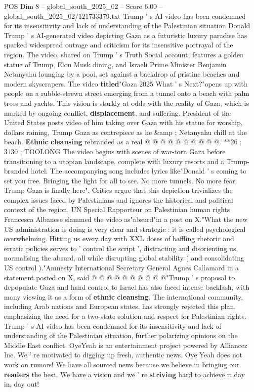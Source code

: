 \begin{textsample}{POS Dim 8 – global\_south\_2025\_02 – Score 6.00 – global\_south\_2025\_02/121733379.txt}  \label{ex:f8_pos_079}
Trump ' s AI video has been condemned for its insensitivity and lack of understanding of the Palestinian situation Donald Trump ' s AI-generated video depicting Gaza as a futuristic luxury paradise has sparked widespread outrage and criticism for its insensitive portrayal of the region.
The video, shared on Trump ' s Truth Social account, features a golden statue of Trump, Elon Musk dining, and Israeli Prime Minister Benjamin Netanyahu lounging by a pool, set against a backdrop of pristine beaches and modern skyscrapers.
The video \textbf{titled}"Gaza 2025 What ' s Next?"opens up with people on a rubble-strewn street emerging from a tunnel onto a beach with palm trees and yachts.
This vision is starkly at odds with the reality of Gaza, which is marked by ongoing conflict, \textbf{displacement}, and suffering.
President of the United States posts video of him taking over Gaza with his statue for worship, dollars raining, Trump Gaza as centrepiece as he \&amp ; Netanyahu chill at the beach. \textbf{Ethnic} \textbf{cleansing} rebranded as a real @ @ @ @ @ @ @ @ @ @. **26 ; 3130 ; TOOLONG The video begins with scenes of war-torn Gaza before transitioning to a utopian landscape, complete with luxury resorts and a Trump-branded hotel.
The accompanying song includes lyrics like"Donald ' s coming to set you free.
Bringing the light for all to see.
No more tunnels.
No more fear.
Trump Gaza is finally here".
Critics argue that this depiction trivializes the complex issues faced by Palestinians and ignores the historical and political context of the region.
UN Special Rapporteur on Palestinian human rights Francesca Albanese slammed the video as"absurd"in a post on X."What the new US administration is doing is very clear and strategic : it is called psychological overwhelming.
Hitting us every day with XXL doses of baffling rhetoric and erratic policies serves to ' control the script ', distracting and disorienting us, normalising the absurd, all while disrupting global stability ( and consolidating US control )."Amnesty International Secretary General Agnes Callamard in a statement posted on X, said @ @ @ @ @ @ @ @ @ @"Trump ' s proposal to depopulate Gaza and hand control to Israel has also faced intense backlash, with many viewing it as a form of \textbf{ethnic} \textbf{cleansing}.
The international community, including Arab nations and European states, has strongly rejected this plan, emphasizing the need for a two-state solution and respect for Palestinian rights.
Trump ' s AI video has been condemned for its insensitivity and lack of understanding of the Palestinian situation, further polarizing opinions on the Middle East conflict.
OyeYeah is an entertainment project powered by Alliancez Inc.
We ' re motivated to digging up fresh, authentic news.
Oye Yeah does not work on rumors!
We have all sourced news because we believe in bringing our \textbf{readers} the best.
We have a vision and we ' re \textbf{striving} hard to achieve it day in, day out!

\end{textsample}
